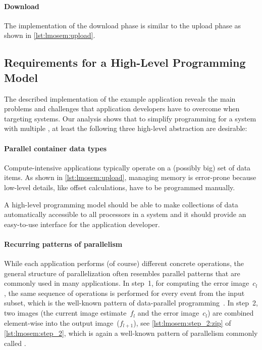 \paragraph{Download}
The implementation of the download phase is similar to the upload phase as shown in \autoref{lst:lmosem:upload}.


\subsection[Requirements for a High-Level\\ Programming Model]{Requirements for a High-Level Programming Model}
\label{section:requirements}
The described implementation of the example application reveals the main problems and challenges that application developers have to overcome when targeting \GPU systems.
Our analysis shows that to simplify programming for a system with multiple \GPUs, at least the following three high-level abstraction are desirable:

\paragraph{Parallel container data types}
Compute-intensive applications typically operate on a (possibly big) set of data items.
As shown in \autoref{lst:lmosem:upload}, managing memory is error-prone because low-level details, like offset calculations, have to be programmed manually.

A high-level programming model should be able to make collections of data automatically accessible to all processors in a system and it should provide an easy-to-use interface for the application developer.

\paragraph{Recurring patterns of parallelism}
While each application performs (of course) different concrete operations, the general structure of parallelization often resembles parallel patterns that are commonly used in many applications.
In step~1, for computing the error image~$c_l$, the same sequence of operations is performed for every event from the input subset, which is the well-known \map pattern of data-parallel programming~\cite{GorlatchCo2011}.
In step~2, two images (the current image estimate~$f_l$ and the error image~$c_l$) are combined element-wise into the output image~($f_{l+1}$), see \autoref{lst:lmosem:step_2:zip} of \autoref{lst:lmosem:step_2}, which is again a well-known pattern of parallelism commonly called \zip.

